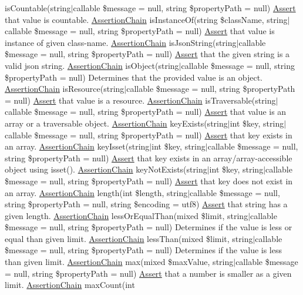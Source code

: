 is\+Countable(string$\vert$callable \$message = null, string \$property\+Path = null) \mbox{\hyperlink{class_assert_1_1_assert}{Assert}} that value is countable.  \mbox{\hyperlink{class_assert_1_1_assertion_chain}{Assertion\+Chain}} is\+Instance\+Of(string \$class\+Name, string$\vert$callable \$message = null, string \$property\+Path = null) \mbox{\hyperlink{class_assert_1_1_assert}{Assert}} that value is instance of given class-\/name.  \mbox{\hyperlink{class_assert_1_1_assertion_chain}{Assertion\+Chain}} is\+Json\+String(string$\vert$callable \$message = null, string \$property\+Path = null) \mbox{\hyperlink{class_assert_1_1_assert}{Assert}} that the given string is a valid json string.  \mbox{\hyperlink{class_assert_1_1_assertion_chain}{Assertion\+Chain}} is\+Object(string$\vert$callable \$message = null, string \$property\+Path = null) Determines that the provided value is an object.  \mbox{\hyperlink{class_assert_1_1_assertion_chain}{Assertion\+Chain}} is\+Resource(string$\vert$callable \$message = null, string \$property\+Path = null) \mbox{\hyperlink{class_assert_1_1_assert}{Assert}} that value is a resource.  \mbox{\hyperlink{class_assert_1_1_assertion_chain}{Assertion\+Chain}} is\+Traversable(string$\vert$callable \$message = null, string \$property\+Path = null) \mbox{\hyperlink{class_assert_1_1_assert}{Assert}} that value is an array or a traversable object.  \mbox{\hyperlink{class_assert_1_1_assertion_chain}{Assertion\+Chain}} key\+Exists(string$\vert$int \$key, string$\vert$callable \$message = null, string \$property\+Path = null) \mbox{\hyperlink{class_assert_1_1_assert}{Assert}} that key exists in an array.  \mbox{\hyperlink{class_assert_1_1_assertion_chain}{Assertion\+Chain}} key\+Isset(string$\vert$int \$key, string$\vert$callable \$message = null, string \$property\+Path = null) \mbox{\hyperlink{class_assert_1_1_assert}{Assert}} that key exists in an array/array-\/accessible object using isset().  \mbox{\hyperlink{class_assert_1_1_assertion_chain}{Assertion\+Chain}} key\+Not\+Exists(string$\vert$int \$key, string$\vert$callable \$message = null, string \$property\+Path = null) \mbox{\hyperlink{class_assert_1_1_assert}{Assert}} that key does not exist in an array.  \mbox{\hyperlink{class_assert_1_1_assertion_chain}{Assertion\+Chain}} length(int \$length, string$\vert$callable \$message = null, string \$property\+Path = null, string \$encoding = \textquotesingle{}utf8\textquotesingle{}) \mbox{\hyperlink{class_assert_1_1_assert}{Assert}} that string has a given length.  \mbox{\hyperlink{class_assert_1_1_assertion_chain}{Assertion\+Chain}} less\+Or\+Equal\+Than(mixed \$limit, string$\vert$callable \$message = null, string \$property\+Path = null) Determines if the value is less or equal than given limit.  \mbox{\hyperlink{class_assert_1_1_assertion_chain}{Assertion\+Chain}} less\+Than(mixed \$limit, string$\vert$callable \$message = null, string \$property\+Path = null) Determines if the value is less than given limit.  \mbox{\hyperlink{class_assert_1_1_assertion_chain}{Assertion\+Chain}} max(mixed \$max\+Value, string$\vert$callable \$message = null, string \$property\+Path = null) \mbox{\hyperlink{class_assert_1_1_assert}{Assert}} that a number is smaller as a given limit.  \mbox{\hyperlink{class_assert_1_1_assertion_chain}{Assertion\+Chain}} max\+Count(int 